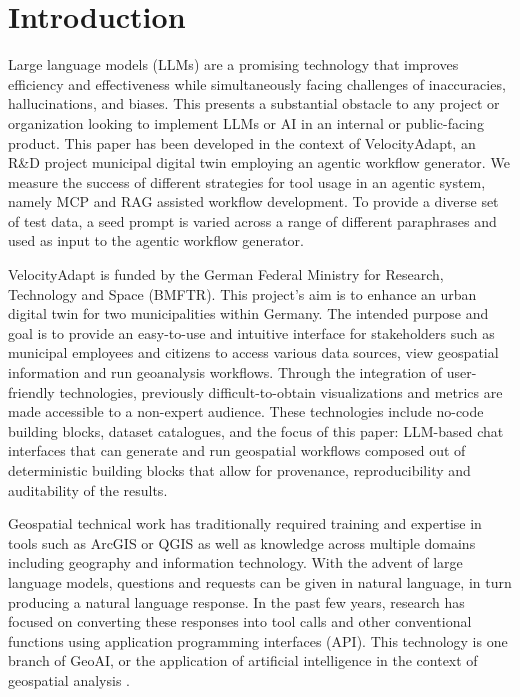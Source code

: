 \section{Introduction}
\label{sec:introduction}

Large language models (LLMs) are a promising technology that improves efficiency and
effectiveness while simultaneously facing challenges of inaccuracies, hallucinations, and
biases. This presents a substantial obstacle to any project or organization looking to
implement LLMs or AI in an internal or public-facing product. This paper has been developed in
the context of VelocityAdapt, an R\&D project municipal digital twin employing an agentic
workflow generator. We measure the success of different strategies for tool usage in an agentic
system, namely MCP and RAG assisted workflow development. To provide a diverse set of test data,
a seed prompt is varied across a range of different paraphrases and used as input to the agentic
workflow generator.

VelocityAdapt is funded by the German Federal Ministry for Research, Technology and Space
(BMFTR). This project's aim is to enhance an urban digital twin for two municipalities within
Germany. The intended purpose and goal is to provide an easy-to-use and intuitive interface for
stakeholders such as municipal employees and citizens to access various data sources, view
geospatial information and run geoanalysis workflows. Through the integration of user-friendly
technologies, previously difficult-to-obtain visualizations and metrics are made accessible to a
non-expert audience. These technologies include no-code building blocks, dataset catalogues, and
the focus of this paper: LLM-based chat interfaces that can generate and run geospatial
workflows composed out of deterministic building blocks that allow for provenance,
reproducibility and auditability of the results.

Geospatial technical work has traditionally required training and expertise in tools such as
ArcGIS or QGIS as well as knowledge across multiple domains including geography and information
technology. With the advent of large language models, questions and requests can be given in
natural language, in turn producing a natural language response. In the past few years, research
has focused on converting these responses into tool calls and other conventional functions using
application programming interfaces (API). This technology is one branch of GeoAI, or the
application of artificial intelligence in the context of geospatial analysis
\citep{janowicz2020}.

